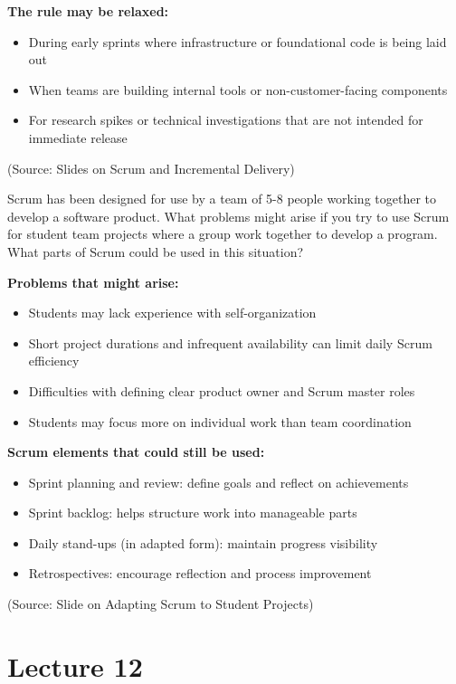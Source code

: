 \documentclass[12pt]{article}
\begin{document}
\textbf{The rule may be relaxed:}
\begin{itemize}
    \item During early sprints where infrastructure or foundational code is being laid out
    \item When teams are building internal tools or non-customer-facing components
    \item For research spikes or technical investigations that are not intended for immediate release
\end{itemize}

(Source: Slides on Scrum and Incremental Delivery)

\begin{questionbox}
Scrum has been designed for use by a team of 5-8 people working together to develop a software product. What problems might arise if you try to use Scrum for student team projects where a group work together to develop a program. What parts of Scrum could be used in this situation?
\end{questionbox}

\textbf{Problems that might arise:}
\begin{itemize}
    \item Students may lack experience with self-organization
    \item Short project durations and infrequent availability can limit daily Scrum efficiency
    \item Difficulties with defining clear product owner and Scrum master roles
    \item Students may focus more on individual work than team coordination
\end{itemize}

\textbf{Scrum elements that could still be used:}
\begin{itemize}
    \item Sprint planning and review: define goals and reflect on achievements
    \item Sprint backlog: helps structure work into manageable parts
    \item Daily stand-ups (in adapted form): maintain progress visibility
    \item Retrospectives: encourage reflection and process improvement
\end{itemize}

(Source: Slide on Adapting Scrum to Student Projects)

\newpage
\section{Lecture 12}
\end{document}
